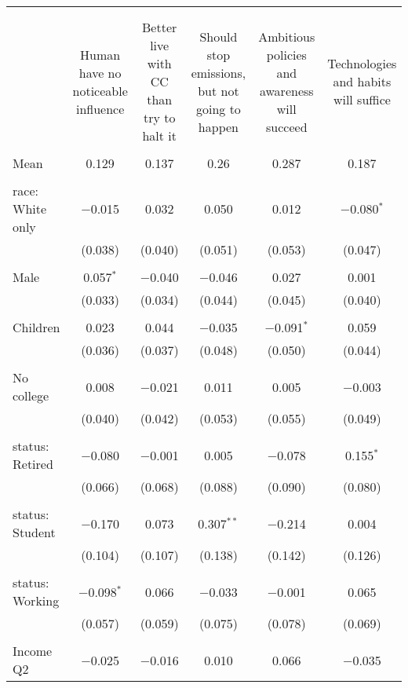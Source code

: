 
\begin{tabular}{@{\extracolsep{5pt}}lccccc} 
\\[-1.8ex]\hline 
\hline \\[-1.8ex] 
\\[-1.8ex] & Human have no noticeable influence & Better live with CC than try to halt it & Should stop emissions, but not going to happen & Ambitious policies and awareness will succeed & Technologies and habits will suffice \\ 
\hline \\[-1.8ex] 
 Mean & 0.129 & 0.137 & 0.26 & 0.287 & 0.187  \\ \hline \\[-1.8ex] race: White only & $-$0.015 & 0.032 & 0.050 & 0.012 & $-$0.080$^{*}$ \\ 
  & (0.038) & (0.040) & (0.051) & (0.053) & (0.047) \\ 
  & & & & & \\ 
 Male & 0.057$^{*}$ & $-$0.040 & $-$0.046 & 0.027 & 0.001 \\ 
  & (0.033) & (0.034) & (0.044) & (0.045) & (0.040) \\ 
  & & & & & \\ 
 Children & 0.023 & 0.044 & $-$0.035 & $-$0.091$^{*}$ & 0.059 \\ 
  & (0.036) & (0.037) & (0.048) & (0.050) & (0.044) \\ 
  & & & & & \\ 
 No college & 0.008 & $-$0.021 & 0.011 & 0.005 & $-$0.003 \\ 
  & (0.040) & (0.042) & (0.053) & (0.055) & (0.049) \\ 
  & & & & & \\ 
 status: Retired & $-$0.080 & $-$0.001 & 0.005 & $-$0.078 & 0.155$^{*}$ \\ 
  & (0.066) & (0.068) & (0.088) & (0.090) & (0.080) \\ 
  & & & & & \\ 
 status: Student & $-$0.170 & 0.073 & 0.307$^{**}$ & $-$0.214 & 0.004 \\ 
  & (0.104) & (0.107) & (0.138) & (0.142) & (0.126) \\ 
  & & & & & \\ 
 status: Working & $-$0.098$^{*}$ & 0.066 & $-$0.033 & $-$0.001 & 0.065 \\ 
  & (0.057) & (0.059) & (0.075) & (0.078) & (0.069) \\ 
  & & & & & \\ 
 Income Q2 & $-$0.025 & $-$0.016 & 0.010 & 0.066 & $-$0.035 \\ 

\end{tabular}
